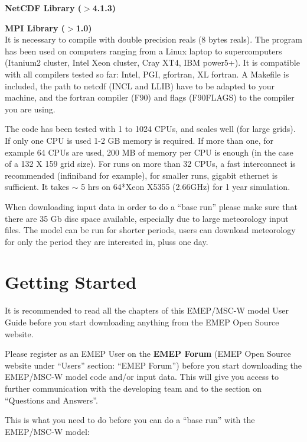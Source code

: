 \textbf{NetCDF Library ($>$4.1.3)}

\textbf{MPI Library ($>$1.0)}\\

It is necessary to compile with double precision reals (8 bytes
reals). The program has been used on computers ranging from a Linux laptop to supercomputers 
(Itanium2 cluster, Intel Xeon cluster, Cray XT4, IBM power5+). It is compatible with all 
compilers tested so far:  Intel, PGI, gfortran, XL fortran. A Makefile is included,  
the path to netcdf (INCL and LLIB) have to be adapted to your machine, and the fortran 
compiler (F90) and flags (F90FLAGS) to the compiler you are using.



The code has been tested with 1 to 1024 CPUs, and scales well (for large grids).  If only one 
CPU is used 1-2 GB memory is required. If more than one,
for example 64 CPUs are used, 200 MB of memory per CPU is enough (in
the case of a 132 X 159 grid size). For runs on more than 32 CPUs, a fast interconnect is 
recommended (infiniband for example), for smaller runs, gigabit ethernet is sufficient. 
It takes $\sim$ 5 hrs on 64*Xeon X5355 (2.66GHz) for 1 year simulation.

When downloading input data in order to do a ``base run'' please make
sure that there are 35 Gb disc space available, especially due to
large meteorology input files. The model can be run for shorter periods, users 
can download meteorology for only the period they are interested in, pluss one day. 
 

\section{Getting Started}


It is recommended to read all the chapters of this EMEP/MSC-W model
User Guide before you start downloading anything from the EMEP Open
Source website.

Please register as an EMEP User on the {\bf EMEP Forum}
(EMEP Open Source website under ``Users'' section: ``EMEP Forum'')
before you start downloading the EMEP/MSC-W model code and/or input
data. This will give you access to further communication with the
developing team and to the section on ``Questions and Answers''. 


This is what you need to do before you can do a ``base run'' with the 
EMEP/MSC-W model:

